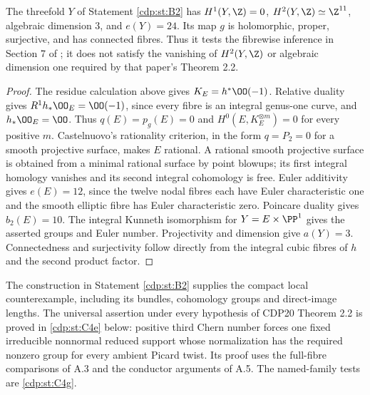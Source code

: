 
\begin{proposition}\label{cdp:st:B3}
The threefold $Y$ of Statement \ref{cdp:st:B2} has $H^1(Y,\Z)=0$, $H^2(Y,\Z)\simeq\Z^{11}$, algebraic dimension $3$, and $e(Y)=24$. Its map $g$ is holomorphic, proper, surjective, and has connected fibres. Thus it tests the fibrewise inference in Section 7 of \cite{CDP20}; it does not satisfy the vanishing of $H^2(Y,\Z)$ or algebraic dimension one required by that paper's Theorem 2.2.
\end{proposition}
\begin{proof}
The residue calculation above gives $K_E=h^*\OO(-1)$. Relative duality gives $R^1h_*\OO_E=\OO(-1)$, since every fibre is an integral genus-one curve, and $h_*\OO_E=\OO$. Thus $q(E)=p_g(E)=0$ and $H^0(E,K_E^{\otimes m})=0$ for every positive $m$. Castelnuovo's rationality criterion, in the form $q=P_2=0$ for a smooth projective surface, makes $E$ rational. A rational smooth projective surface is obtained from a minimal rational surface by point blowups; its first integral homology vanishes and its second integral cohomology is free. Euler additivity gives $e(E)=12$, since the twelve nodal fibres each have Euler characteristic one and the smooth elliptic fibre has Euler characteristic zero. Poincare duality gives $b_2(E)=10$. The integral Kunneth isomorphism for $Y=E\times\PP^1$ gives the asserted groups and Euler number. Projectivity and dimension give $a(Y)=3$. Connectedness and surjectivity follow directly from the integral cubic fibres of $h$ and the second product factor.
\end{proof}

The construction in Statement \ref{cdp:st:B2} supplies the compact local counterexample, including its bundles, cohomology groups and direct-image lengths. The universal assertion under every hypothesis of CDP20 Theorem 2.2 is proved in \ref{cdp:st:C4e} below: positive third Chern number forces one fixed irreducible nonnormal reduced support whose normalization has the required nonzero group for every ambient Picard twist. Its proof uses the full-fibre comparisons of A.3 and the conductor arguments of A.5. The named-family tests are \ref{cdp:st:C4g}.



